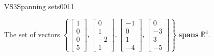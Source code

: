 \begin{exercise}{VS3}{Spanning sets}{0011}
\begin{exerciseAnswer}
 The set of vectors \(\left\{ \left[\begin{array}{c}
1 \\
0 \\
0 \\
5
\end{array}\right] , \left[\begin{array}{c}
0 \\
1 \\
-2 \\
1
\end{array}\right] , \left[\begin{array}{c}
-1 \\
0 \\
1 \\
-4
\end{array}\right] , \left[\begin{array}{c}
0 \\
-3 \\
3 \\
-5
\end{array}\right] \right\}\) \textbf{spans} \(\mathbb{R}^4\). 

 \end{exerciseAnswer}
 \end{exercise}



